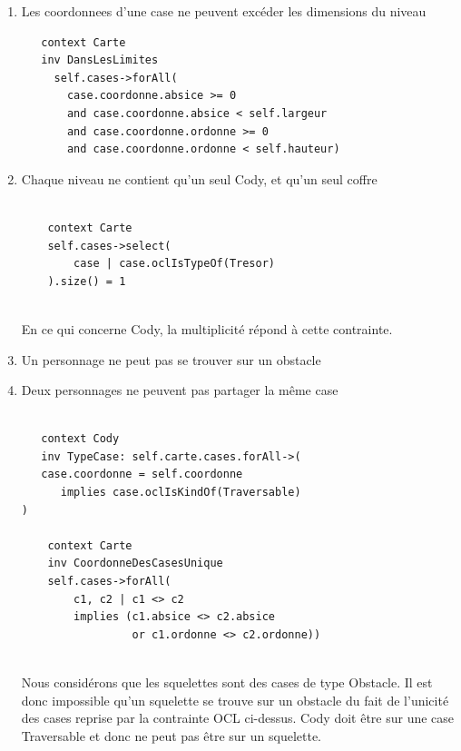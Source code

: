 \documentclass[11pt]{article}
\begin{document}
\begin{enumerate}
 
 \item Les coordonnees d'une case ne peuvent excéder les dimensions du niveau
 
 \begin{verbatim}
   context Carte
   inv DansLesLimites
     self.cases->forAll(
       case.coordonne.absice >= 0
       and case.coordonne.absice < self.largeur
       and case.coordonne.ordonne >= 0
       and case.coordonne.ordonne < self.hauteur)
 \end{verbatim}
  
  \item Chaque niveau ne contient qu'un seul Cody, et qu'un seul coffre  
  
  \begin{verbatim}
    
    context Carte
    self.cases->select(
        case | case.oclIsTypeOf(Tresor)
    ).size() = 1    
    
  \end{verbatim}    
  
  En ce qui concerne Cody, la multiplicité répond à cette contrainte.\\
  
  
  \item Un personnage ne peut pas se trouver sur un obstacle 
  
  \item Deux personnages ne peuvent pas partager la même case
  
  \begin{verbatim}
    
   context Cody
   inv TypeCase: self.carte.cases.forAll->(
   case.coordonne = self.coordonne 
      implies case.oclIsKindOf(Traversable)
)    
    
    context Carte
    inv CoordonneDesCasesUnique
    self.cases->forAll(
        c1, c2 | c1 <> c2 
        implies (c1.absice <> c2.absice 
                 or c1.ordonne <> c2.ordonne))    
    
  \end{verbatim}     
  
  Nous considérons que les squelettes sont des cases de type Obstacle. Il est donc impossible qu'un squelette se trouve sur un obstacle du fait de l'unicité des cases reprise par la contrainte OCL ci-dessus. Cody doit être sur une case Traversable et donc ne peut pas être sur un squelette.\\
  

\end{enumerate}
\end{document}
